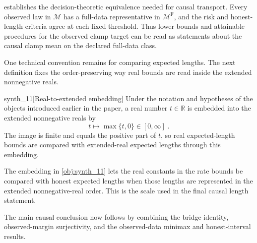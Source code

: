  establishes the decision-theoretic equivalence needed for causal transport. Every observed law in \(\mathcal M\) has a full-data representative in \(\mathcal M^{\mathrm F}\), and the risk and honest-length criteria agree at each fixed threshold. Thus lower bounds and attainable procedures for the observed clamp target can be read as statements about the causal clamp mean on the declared full-data class.

One technical convention remains for comparing expected lengths. The next definition fixes the order-preserving way real bounds are read inside the extended nonnegative reals.

\begin{definitionv}{synth_11}[Real-to-extended embedding]
Under the notation and hypotheses of the objects introduced earlier in the paper, a real number \(t\in\mathbb R\) is embedded into the extended nonnegative reals by
\[
t\longmapsto \max\{t,0\}\in[0,\infty]\;.
\]
The image is finite and equals the positive part of \(t\), so real expected-length bounds are compared with extended-real expected lengths through this embedding.
\end{definitionv}

The embedding in \cref{obj:synth_11} lets the real constants in the rate bounds be compared with honest expected lengths when those lengths are represented in the extended nonnegative-real order. This is the scale used in the final causal length statement.

The main causal conclusion now follows by combining the bridge identity, observed-margin surjectivity, and the observed-data minimax and honest-interval results.

